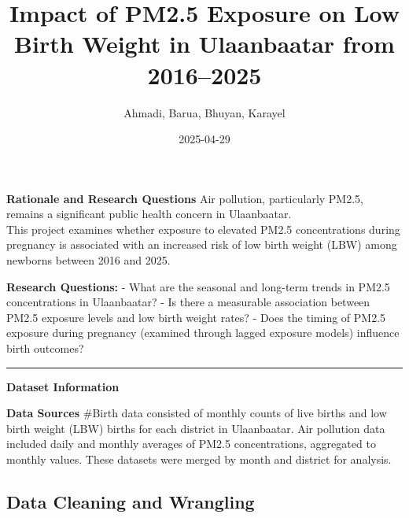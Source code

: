 \documentclass[
]{article}
\title{Impact of PM2.5 Exposure on Low Birth Weight in Ulaanbaatar from
2016--2025}
\author{Ahmadi, Barua, Bhuyan, Karayel}
\date{2025-04-29}
\begin{document}
\maketitle

{
\setcounter{tocdepth}{2}
\tableofcontents
}
\textbf{Rationale and Research Questions} Air pollution, particularly
PM2.5, remains a significant public health concern in Ulaanbaatar.\\
This project examines whether exposure to elevated PM2.5 concentrations
during pregnancy is associated with an increased risk of low birth
weight (LBW) among newborns between 2016 and 2025.

\textbf{Research Questions:} - What are the seasonal and long-term
trends in PM2.5 concentrations in Ulaanbaatar? - Is there a measurable
association between PM2.5 exposure levels and low birth weight rates? -
Does the timing of PM2.5 exposure during pregnancy (examined through
lagged exposure models) influence birth outcomes?

\begin{center}\rule{0.5\linewidth}{0.5pt}\end{center}

\textbf{Dataset Information}

\textbf{Data Sources} \#Birth data consisted of monthly counts of live
births and low birth weight (LBW) births for each district in
Ulaanbaatar. Air pollution data included daily and monthly averages of
PM2.5 concentrations, aggregated to monthly values. These datasets were
merged by month and district for analysis.

\subsection{Data Cleaning and
Wrangling}\label{data-cleaning-and-wrangling}
\end{document}
